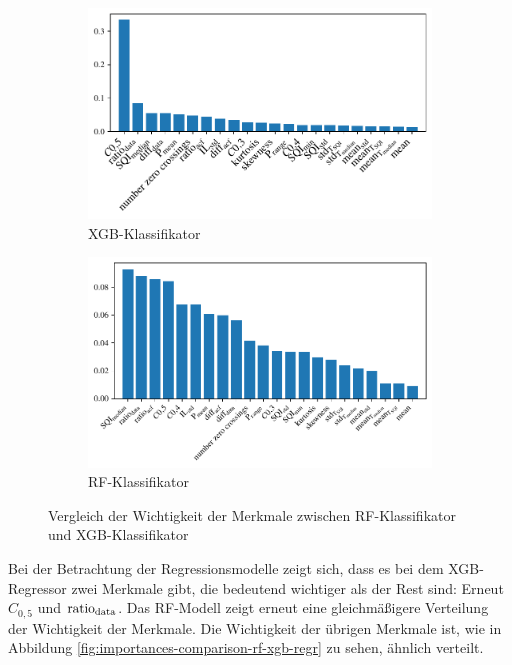  \begin{figure}[h]
 	\centering
		\begin{subfigure}{.49\textwidth}
			\centering
 			\includegraphics[width=\textwidth]{pic/xgb-clf-final-importances.pdf}
 			\caption{\ac{XGB}-Klassifikator}
 		\end{subfigure}
    	\begin{subfigure}{.49\textwidth}
    		\centering
 			\includegraphics[width=\textwidth]{pic/rf-clf-final-importances.pdf}
 			\caption{\ac{RF}-Klassifikator}
 		\end{subfigure}
 	\caption{Vergleich der Wichtigkeit der Merkmale zwischen \ac{RF}-Klassifikator und \ac{XGB}-Klassifikator}
 	\label{fig:importances-comparison-rf-xgb-clf}
 \end{figure}

Bei der Betrachtung der Regressionsmodelle zeigt sich, dass es bei dem \ac{XGB}-Regressor zwei Merkmale gibt, die bedeutend wichtiger als der Rest sind: Erneut $C_{0,5}$ und $\text{ratio}\textsubscript{data}$. Das \ac{RF}-Modell zeigt erneut eine gleichmäßigere Verteilung der Wichtigkeit der Merkmale. Die Wichtigkeit der übrigen Merkmale ist, wie in Abbildung \ref{fig:importances-comparison-rf-xgb-regr} zu sehen, ähnlich verteilt.

